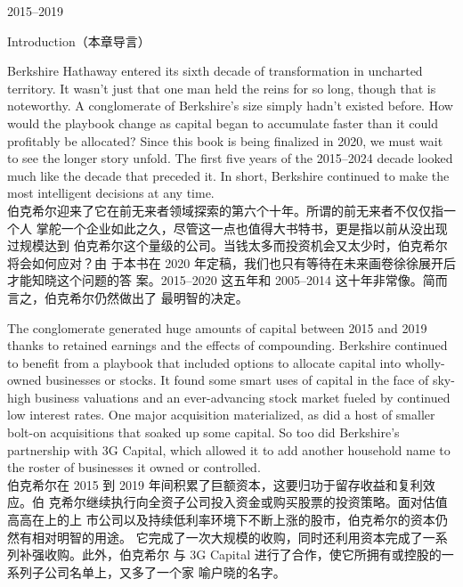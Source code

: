 \begin{chapter}{2015--2019}
\begin{section}{Introduction（本章导言）}
\begin{verseparallel}
  {
    Berkshire Hathaway entered its sixth decade of transformation in uncharted
    territory. It wasn't just that one man held the reins for so long, though
    that is noteworthy. A conglomerate of Berkshire's size simply hadn't
    existed before. How would the playbook change as capital began to accumulate
    faster than it could profitably be allocated? Since this book is being
    finalized in 2020, we must wait to see the longer story unfold. The first
    five years of the 2015–2024 decade looked much like the decade that preceded
    it. In short, Berkshire continued to make the most intelligent decisions at
    any time. \\
  }
  {
    伯克希尔迎来了它在前无来者领域探索的第六个十年。所谓的前无来者不仅仅指一个人
    掌舵一个企业如此之久，尽管这一点也值得大书特书，更是指以前从没出现过规模达到
    伯克希尔这个量级的公司。当钱太多而投资机会又太少时，伯克希尔将会如何应对？由
    于本书在 2020 年定稿，我们也只有等待在未来画卷徐徐展开后才能知晓这个问题的答
    案。2015--2020 这五年和 2005--2014 这十年非常像。简而言之，伯克希尔仍然做出了
    最明智的决定。
  }
\end{verseparallel}

\begin{verseparallel}
  {
    The conglomerate generated huge amounts of capital between 2015 and
    2019 thanks to retained earnings and the effects of compounding. Berkshire
    continued to benefit from a playbook that included options to allocate
    capital into wholly-owned businesses or stocks. It found some smart uses of
    capital in the face of sky-high business valuations and an ever-advancing
    stock market fueled by continued low interest rates. One major acquisition
    materialized, as did a host of smaller bolt-on acquisitions that soaked up
    some capital. So too did Berkshire's partnership with 3G Capital, which
    allowed it to add another household name to the roster of businesses it
    owned or controlled.\\
  }
  {
    伯克希尔在 2015 到 2019 年间积累了巨额资本，这要归功于留存收益和复利效应。伯
    克希尔继续执行向全资子公司投入资金或购买股票的投资策略。面对估值高高在上的上
    市公司以及持续低利率环境下不断上涨的股市，伯克希尔的资本仍然有相对明智的用途。
    它完成了一次大规模的收购，同时还利用资本完成了一系列补强收购。此外，伯克希尔
    与 3G Capital 进行了合作，使它所拥有或控股的一系列子公司名单上，又多了一个家
    喻户晓的名字。
  }
\end{verseparallel}


\end{section}
\end{chapter}
